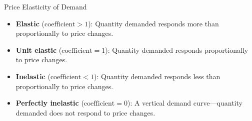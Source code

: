 \documentclass[10pt]{article}
\begin{document}
\begin{core}{Price Elasticity of Demand}
\begin{itemize}
        \item \textbf{Elastic} ($\text{coefficient} > 1$): Quantity demanded responds more than proportionally to price changes.

        \item \textbf{Unit elastic} ($\text{coefficient} = 1$): Quantity demanded responds proportionally to price changes.


        \item \textbf{Inelastic} ($\text{coefficient} < 1$): Quantity demanded responds less than proportionally to price changes.

        \item \textbf{Perfectly inelastic} ($\text{coefficient} = 0$): A vertical demand curve—quantity demanded does not respond to price changes.


      \end{itemize}

    \end{core}
\end{document}
